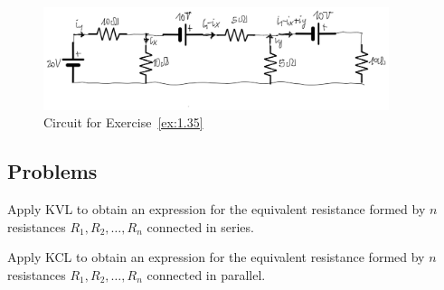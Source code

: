 \begin{figure}[h!]
  \centering
  \includegraphics[width=0.9\textwidth]{"images/Fig-14"}
  \caption{Circuit for Exercise~\ref{ex:1.35}} 
  \label{Fig:Ex:1.35}
\end{figure}

\subsection*{Problems}
\begin{problem}
Apply KVL to obtain an expression for the equivalent resistance  formed by $n$ resistances $R_1, R_2,\ldots, R_n$ connected in series.
\end{problem}

\begin{problem}
Apply KCL to obtain an expression for the equivalent resistance  formed by $n$ resistances $R_1, R_2,\ldots, R_n$ connected in parallel.
\end{problem}